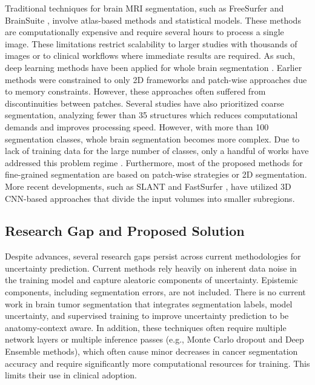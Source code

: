 \documentclass[11pt,letterpaper]{article}
\begin{document}
Traditional techniques for brain MRI segmentation, such as FreeSurfer \cite{fischl2012} and BrainSuite \cite{shattuck2002}, involve atlas-based methods and statistical models. These methods are computationally expensive and require several hours to process a single image. These limitations restrict scalability to larger studies with thousands of images or to clinical workflows where immediate results are required. As such, deep learning methods have been applied for whole brain segmentation \cite{yu2022,coupe2020}. Earlier methods were constrained to only 2D frameworks and patch-wise approaches due to memory constraints. However, these approaches often suffered from discontinuities between patches. Several studies have also prioritized coarse segmentation, analyzing fewer than 35 structures which reduces computational demands and improves processing speed. However, with more than 100 segmentation classes, whole brain segmentation becomes more complex. Due to lack of training data for the large number of classes, only a handful of works have addressed this problem regime \cite{xiong2019,henschel2020}. Furthermore, most of the proposed methods for fine-grained segmentation are based on patch-wise strategies or 2D segmentation. More recent developments, such as SLANT \cite{xiong2019} and FastSurfer \cite{henschel2020}, have utilized 3D CNN-based approaches that divide the input volumes into smaller subregions.
\subsection{Research Gap and Proposed Solution}
Despite advances, several research gaps persist across current methodologies for uncertainty prediction. Current methods rely heavily on inherent data noise in the training model and capture aleatoric components of uncertainty. Epistemic components, including segmentation errors, are not included. There is no current work in brain tumor segmentation that integrates segmentation labels, model uncertainty, and supervised training to improve uncertainty prediction to be anatomy-context aware. In addition, these techniques often require multiple network layers or multiple inference passes (e.g., Monte Carlo dropout and Deep Ensemble methods), which often cause minor decreases in cancer segmentation accuracy and require significantly more computational resources for training. This limits their use in clinical adoption.
\end{document}

